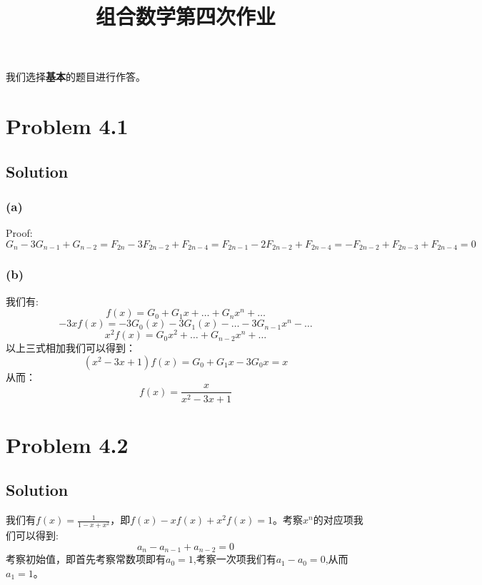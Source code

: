 \documentclass[a4paper]{ctexart}
\title{组合数学第四次作业}
\begin{document}
\maketitle
\thispagestyle{empty}		%

\tableofcontents
\thispagestyle{empty}		%

\newpage
\setcounter{page}{1}

我们选择\textbf{基本}的题目进行作答。
\section{Problem 4.1}
\subsection{Solution}
\subsubsection{(a)}
Proof:
\begin{equation}
    G_n-3G_{n-1}+G_{n-2} = F_{2n} - 3F_{2n-2} + F_{2n-4} = F_{2n-1} - 2F_{2n-2} +F_{2n-4} = -F_{2n-2} + F_{2n-3} + F_{2n-4} = 0
\end{equation}
\subsubsection{(b)}
我们有:
\begin{equation}
    f(x) = G_0 + G_1x + \dots + G_nx^n + \dots
\end{equation}
\begin{equation}
    -3xf(x) = -3G_0(x) -3G_1(x) - \dots - 3G_{n-1}x^n - \dots
\end{equation}
\begin{equation}
    x^2f(x) = G_0x^2 + \dots + G_{n-2}x^n + \dots
\end{equation}
以上三式相加我们可以得到：
\begin{equation}
    (x^2-3x+1)f(x)=G_0+G_1x-3G_0x = x
\end{equation}
从而：
\begin{equation}
    f(x) = \frac{x}{x^2-3x+1}
\end{equation}

\section{Problem 4.2}
\subsection{Solution}
我们有$f(x)=\frac{1}{1-x+x^2}$，即$f(x)-xf(x)+x^2f(x)=1$。考察$x^n$的对应项我们可以得到:
\begin{equation}
    a_n-a_{n-1}+a_{n-2} = 0
\end{equation}
考察初始值，即首先考察常数项即有$a_0=1$,考察一次项我们有$a_1-a_0=0$,从而$a_1=1$。
\end{document}
